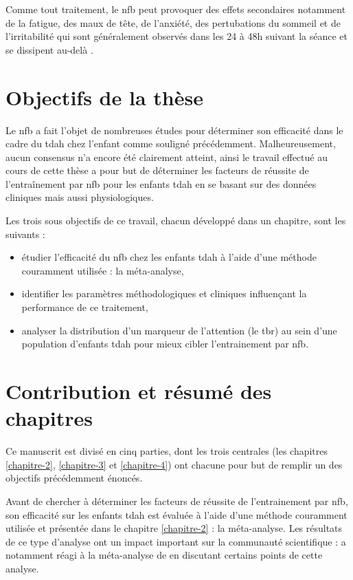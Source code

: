 Comme tout traitement, le \gls{nfb} peut provoquer des effets secondaires notamment de la fatigue, des maux de tête, de l'anxiété, des pertubations du sommeil et de l'irritabilité qui
sont généralement observés dans les 24 à 48h suivant la séance et se dissipent au-delà \citep{Hammond2007}. 


\section{Objectifs de la thèse}

Le \gls{nfb} a fait l'objet de nombreuses études pour déterminer son efficacité dans le cadre du \gls{tdah} chez l'enfant comme souligné précédemment.
Malheureusement, aucun consensus n'a encore été clairement atteint, ainsi le travail effectué au cours de cette thèse a pour but de déterminer les facteurs 
de réussite de l'entraînement par \gls{nfb} pour les enfants \gls{tdah} en se basant sur des données cliniques mais aussi physiologiques. 

Les trois sous objectifs de ce travail, chacun développé dans un chapitre, sont les suivants :
\begin{itemize}
\item étudier l'efficacité du \gls{nfb} chez les enfants \gls{tdah} à l'aide d'une méthode couramment utilisée : la méta-analyse,
\item identifier les paramètres méthodologiques et cliniques influençant la performance de ce traitement,
\item analyser la distribution d'un marqueur de l'attention (le \gls{tbr}) au sein d'une population d'enfants \gls{tdah} pour mieux cibler
l'entrainement par \gls{nfb}. 
\end{itemize}

\section{Contribution et résumé des chapitres}

Ce manuscrit est divisé en cinq parties, dont les trois centrales (les chapitres \ref{chapitre-2}, \ref{chapitre-3} et \ref{chapitre-4}) ont chacune pour but de remplir 
un des objectifs précédemment énoncés.

Avant de chercher à déterminer les facteurs de réussite de l'entrainement par \gls{nfb}, son efficacité sur les enfants \gls{tdah} est évaluée à l'aide 
d'une méthode couramment utilisée \citep{Sonuga-Barke2013, Micoulaud2014, Cortese2016} et présentée dans le chapitre \ref{chapitre-2} : la méta-analyse. 
Les résultats de ce type d'analyse ont un impact important sur la communauté scientifique : \citet{Micoulaud2016} a notamment réagi à la méta-analyse de 
\citet{Cortese2016} en discutant certains points de cette analyse. 

